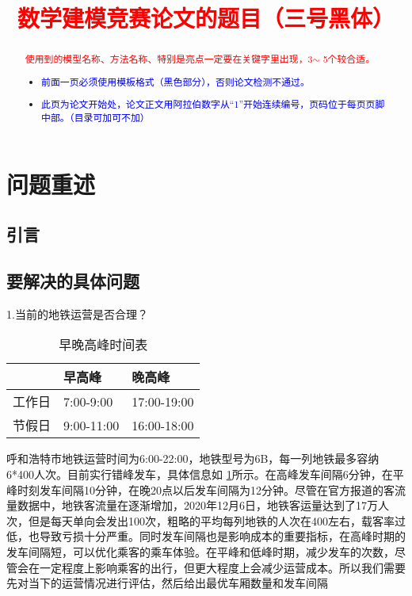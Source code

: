 \documentclass[12pt,a4paper]{mcmthesis}
\title{\textcolor{red}{数学建模竞赛论文的题目（三号黑体）}}
\date{}
\begin{document}
\begin{abstract}


\begin{keywords}
{\song\xiaosihao
\textcolor{red}{使用到的模型名称、方法名称、特别是亮点一定要在关键字里出现，3$\sim$ 5个较合适。}}
\end{keywords}

\begin{itemize}
  \item \textcolor{blue}{前面一页必须使用模板格式（黑色部分），否则论文检测不通过。}
  \item \textcolor{blue}{此页为论文开始处，论文正文用阿拉伯数字从“1”开始连续编号，页码位于每页页脚中部。（目录可加可不加）}
\end{itemize}

\end{abstract}
\maketitle
\renewcommand{\contentsname}{\centerline{\sanhao\bfseries\HEI 目\quad 录}}
\tableofcontents

\newpage
\setcounter{page}{1}
\section{问题重述}
\subsection{引言}


\subsection{要解决的具体问题}

   1.当前的地铁运营是否合理？
   
   \begin{table}
  	\centering
  	\begin{tabular}{|l|l|l|}
  		\hline
  		& 早高峰 & 晚高峰 \\ \hline
  		工作日 & 7:00-9:00 & 17:00-19:00 \\ \hline
  		节假日 & 9:00-11:00 & 16:00-18:00 \\ \hline
  	\end{tabular}
  	\caption{早晚高峰时间表} 
  	\label{tab:早晚高峰}
  \end{table}
  呼和浩特市地铁运营时间为6:00-22:00，地铁型号为6B，每一列地铁最多容纳6*400人次。目前实行错峰发车，具体信息如 \ref{tab:早晚高峰}所示。在高峰发车间隔6分钟，在平峰时刻发车间隔10分钟，在晚20点以后发车间隔为12分钟。尽管在官方报道的客流量数据中，地铁客流量在逐渐增加，2020年12月6日，地铁客运量达到了17万人次，但是每天单向会发出100次，粗略的平均每列地铁的人次在400左右，载客率过低，也导致亏损十分严重。同时发车间隔也是影响成本的重要指标，在高峰时期的发车间隔短，可以优化乘客的乘车体验。在平峰和低峰时期，减少发车的次数，尽管会在一定程度上影响乘客的出行，但更大程度上会减少运营成本。所以我们需要先对当下的运营情况进行评估，然后给出最优车厢数量和发车间隔
\end{document}
